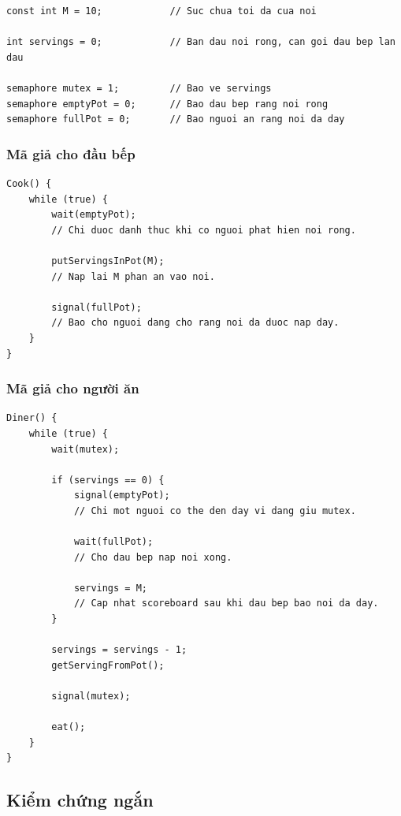 \begin{lstlisting}
const int M = 10;            // Suc chua toi da cua noi

int servings = 0;            // Ban dau noi rong, can goi dau bep lan dau

semaphore mutex = 1;         // Bao ve servings
semaphore emptyPot = 0;      // Bao dau bep rang noi rong
semaphore fullPot = 0;       // Bao nguoi an rang noi da day
\end{lstlisting}

\subsubsection*{Mã giả cho đầu bếp}

\begin{lstlisting}
Cook() {
    while (true) {
        wait(emptyPot);
        // Chi duoc danh thuc khi co nguoi phat hien noi rong.

        putServingsInPot(M);
        // Nap lai M phan an vao noi.

        signal(fullPot);
        // Bao cho nguoi dang cho rang noi da duoc nap day.
    }
}
\end{lstlisting}

\subsubsection*{Mã giả cho người ăn}

\begin{lstlisting}
Diner() {
    while (true) {
        wait(mutex);

        if (servings == 0) {
            signal(emptyPot);
            // Chi mot nguoi co the den day vi dang giu mutex.

            wait(fullPot);
            // Cho dau bep nap noi xong.

            servings = M;
            // Cap nhat scoreboard sau khi dau bep bao noi da day.
        }

        servings = servings - 1;
        getServingFromPot();

        signal(mutex);

        eat();
    }
}
\end{lstlisting}

\subsection{Kiểm chứng ngắn}


